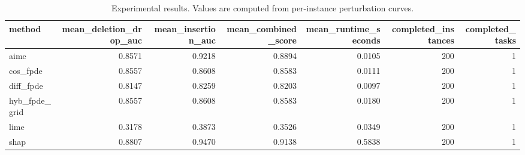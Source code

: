 \begin{table}[t]
\caption{Experimental results. Values are computed from per-instance perturbation curves.}
\label{tab:main_results_computed}
\centering
\begin{tabular}{lrrrrrr}
\toprule
method & mean\_deletion\_drop\_auc & mean\_insertion\_auc & mean\_combined\_score & mean\_runtime\_seconds & completed\_instances & completed\_tasks \\
\midrule
aime & 0.8571 & 0.9218 & 0.8894 & 0.0105 & 200 & 1 \\
cos\_fpde & 0.8557 & 0.8608 & 0.8583 & 0.0111 & 200 & 1 \\
diff\_fpde & 0.8147 & 0.8259 & 0.8203 & 0.0097 & 200 & 1 \\
hyb\_fpde\_grid & 0.8557 & 0.8608 & 0.8583 & 0.0180 & 200 & 1 \\
lime & 0.3178 & 0.3873 & 0.3526 & 0.0349 & 200 & 1 \\
shap & 0.8807 & 0.9470 & 0.9138 & 0.5838 & 200 & 1 \\
\bottomrule
\end{tabular}

\end{table}
